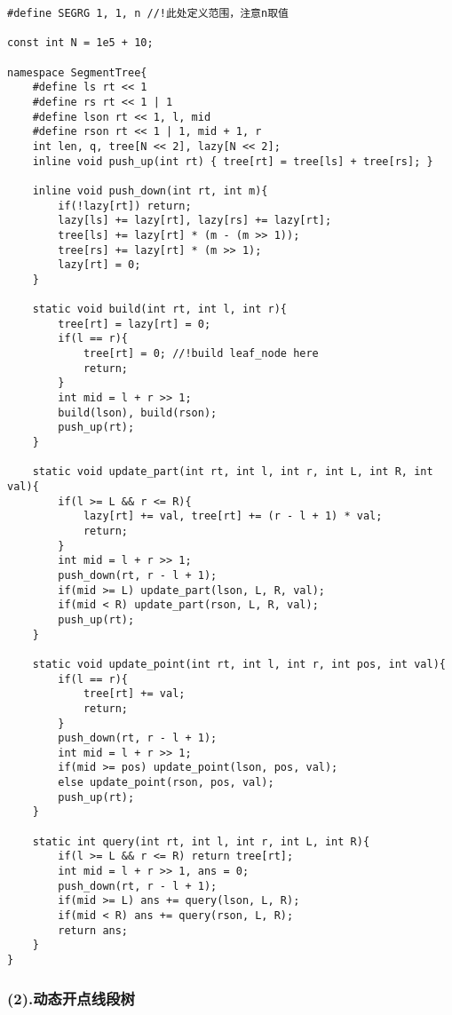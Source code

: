 \documentclass[]{article}
\begin{document}
\begin{verbatim}
#define SEGRG 1, 1, n //!此处定义范围，注意n取值

const int N = 1e5 + 10;

namespace SegmentTree{
    #define ls rt << 1
    #define rs rt << 1 | 1
    #define lson rt << 1, l, mid
    #define rson rt << 1 | 1, mid + 1, r
    int len, q, tree[N << 2], lazy[N << 2];
    inline void push_up(int rt) { tree[rt] = tree[ls] + tree[rs]; }
    
    inline void push_down(int rt, int m){
        if(!lazy[rt]) return;
        lazy[ls] += lazy[rt], lazy[rs] += lazy[rt];
        tree[ls] += lazy[rt] * (m - (m >> 1));
        tree[rs] += lazy[rt] * (m >> 1);
        lazy[rt] = 0;
    }

    static void build(int rt, int l, int r){
        tree[rt] = lazy[rt] = 0;
        if(l == r){
            tree[rt] = 0; //!build leaf_node here
            return; 
        }
        int mid = l + r >> 1;
        build(lson), build(rson);
        push_up(rt);
    }

    static void update_part(int rt, int l, int r, int L, int R, int val){
        if(l >= L && r <= R){
            lazy[rt] += val, tree[rt] += (r - l + 1) * val;
            return;
        }
        int mid = l + r >> 1;
        push_down(rt, r - l + 1);
        if(mid >= L) update_part(lson, L, R, val);
        if(mid < R) update_part(rson, L, R, val);
        push_up(rt);
    }

    static void update_point(int rt, int l, int r, int pos, int val){
        if(l == r){
            tree[rt] += val;
            return;
        }
        push_down(rt, r - l + 1);
        int mid = l + r >> 1;
        if(mid >= pos) update_point(lson, pos, val);
        else update_point(rson, pos, val);
        push_up(rt);
    }

    static int query(int rt, int l, int r, int L, int R){
        if(l >= L && r <= R) return tree[rt];
        int mid = l + r >> 1, ans = 0;
        push_down(rt, r - l + 1);
        if(mid >= L) ans += query(lson, L, R);
        if(mid < R) ans += query(rson, L, R);
        return ans;
    }
}
\end{verbatim}

\hypertarget{ux52a8ux6001ux5f00ux70b9ux7ebfux6bb5ux6811}{%
\subsubsection{(2).动态开点线段树}\label{ux52a8ux6001ux5f00ux70b9ux7ebfux6bb5ux6811}}
\end{document}
